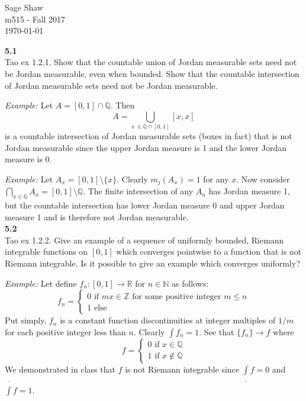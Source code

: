 \documentclass[12pt]{article}
\newcommand{\problem}[1]{\hspace{-4 ex} \large \textbf{#1}\\}
\begin{document}
	\thispagestyle{empty}
	
	\begin{flushright}
		Sage Shaw \\
		m515 - Fall 2017 \\
		\today
	\end{flushright}
	

\problem{5.1} Tao ex 1.2.1. Show that the countable union of Jordan measurable sets need not be Jordan measurable, even when bounded. Show that the countable intersection of Jordan measurable sets need not be Jordan measurable.

	\textit{Example:} Let $A = [0,1] \cap \mathbb{Q}$. Then $$A = \bigcup\limits_{x\ \in \mathbb{Q} \cap [0,1]}[x,x]$$ is a countable intersection of Jordan measurable sets (boxes in fact) that is not Jordan measurable since the upper Jordan measure is 1 and the lower Jordan measure is 0. \bigbreak

	\textit{Example:} Let $A_x = [0,1]\setminus\{x\}$. Clearly $m_j(A_x)=1$ for any $x$. Now consider $\bigcap\limits_{x \in \mathbb{Q}}A_x = [0,1] \setminus \mathbb{Q}$. The finite intersection of any $A_n$ has Jordan measure 1, but the countable intersection has lower Jordan measure 0 and upper Jordan measure 1 and is therefore not Jordan measurable.\\
	
	
\problem{5.2} Tao ex 1.2.2. Give an example of a sequence of uniformly bounded, Riemann integrable functions on $[0,1]$ which converges pointwise to a function that is not Riemann integrable. Is it possible to give an example which converges uniformly?

	\textit{Example:} Let define $f_n:[0,1] \to \mathbb{R}$ for $n \in \mathbb{N}$ as follows: 
	\[
		f_n = 
			\begin{cases}
				0 \text{ if } mx \in \mathbb{Z} \text{ for some positive integer }m \leq n\\
				1 \text{ else }
			\end{cases}
	\]
	Put simply, $f_n$ is a constant function discontinuities at integer multiples of $1/m$ for each positive integer less than $n$. Clearly $\int f_n = 1$. See that $\{f_n\} \to f$ where
	\[
		f = 
			\begin{cases}
				0 \text{ if } x \in \mathbb{Q} \\
				1 \text{ if } x \notin \mathbb{Q}
			\end{cases}
	\]
	We demonstrated in class that $f$ is not Riemann integrable since $\underline{\int} f = 0$ and $\overline {\int} f = 1$.
	
\end{document}

